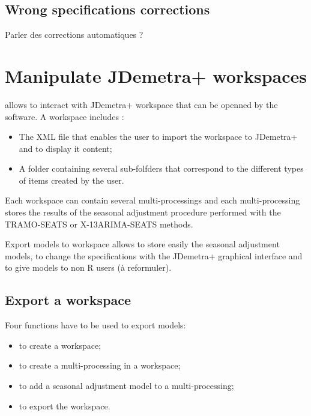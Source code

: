 \documentclass[article]{jss}
\providecommand{\tightlist}{%
  \setlength{\itemsep}{0pt}\setlength{\parskip}{0pt}}
\begin{document}
\hypertarget{wrong-specifications-corrections}{%
\subsection{Wrong specifications
corrections}\label{wrong-specifications-corrections}}

Parler des corrections automatiques ?

\hypertarget{manipulate-workspace}{%
\section{Manipulate JDemetra+ workspaces}\label{manipulate-workspace}}

 allows to interact with JDemetra+ workspace that can be
openned by the software. A workspace includes :

\begin{itemize}
\tightlist
\item
  The XML file that enables the user to import the workspace to
  JDemetra+ and to display it content;\\
\item
  A folder containing several sub-folfders that correspond to the
  different types of items created by the user.
\end{itemize}

Each workspace can contain several multi-processings and each
multi-processing stores the results of the seasonal adjustment procedure
performed with the TRAMO-SEATS or X-13ARIMA-SEATS methods.

Export models to workspace allows to store easily the seasonal
adjustment models, to change the specifications with the JDemetra+
graphical interface and to give models to non R users (à reformuler).

\hypertarget{export-wk}{%
\subsection{Export a workspace}\label{export-wk}}

Four functions have to be used to export models:

\begin{itemize}
\tightlist
\item
   to create a workspace;\\
\item
   to create a multi-processing in a
  workspace;\\
\item
   to add a seasonal adjustment model to a
  multi-processing;\\
\item
   to export the workspace.
\end{itemize}
\end{document}
